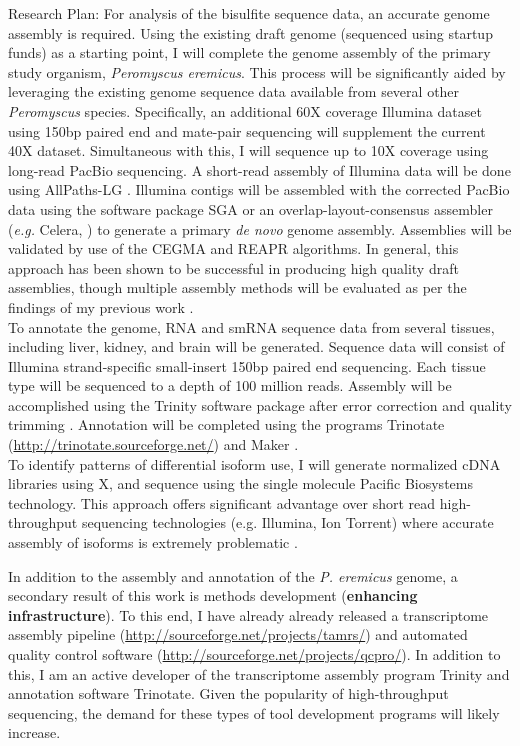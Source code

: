 \documentclass[11pt]{article}
\begin{document}
Research Plan: For analysis of the bisulfite sequence data, an accurate genome assembly is required. Using the existing draft genome (sequenced using startup funds) as a starting point, I will complete the genome assembly of the primary study organism, \textit{Peromyscus eremicus}. This process will be significantly aided by leveraging the existing genome sequence data available from several other \textit{Peromyscus} species. Specifically, an additional 60X coverage Illumina dataset using 150bp paired end and mate-pair sequencing will supplement the current 40X dataset. Simultaneous with this, I will sequence up to 10X coverage using long-read PacBio sequencing. A short-read assembly of Illumina data will be done using AllPaths-LG \citep{Maccallum:2009du}. Illumina contigs will be assembled with the corrected PacBio data using the software package SGA \citep{Simpson:2012ef} or an overlap-layout-consensus assembler (\textit{e.g.} Celera, \cite{Miller:2008jx}) to generate a primary \textit{de novo} genome assembly. Assemblies will be validated by use of the CEGMA \citep{Parra:2007df} and REAPR \citep{Hunt:2013hj} algorithms. In general, this approach has been shown to be successful in producing high quality draft assemblies, though multiple assembly methods will be evaluated as per the findings of my previous work \citep{Bradnam:2013gx}.\\

To annotate the genome, RNA and smRNA sequence data from several tissues, including liver, kidney, and brain will be generated. Sequence data will consist of Illumina strand-specific small-insert 150bp paired end sequencing. Each tissue type will be sequenced to a depth of 100 million reads. Assembly will be accomplished using the Trinity software package \citep{Haas:2013jq,Grabherr:2011jb} after error correction \citep{MacManes:2013ec} and quality trimming \citep{MacManes:2013ex}. Annotation will be completed using the programs Trinotate (\url{http://trinotate.sourceforge.net/}) and Maker \citep{Cantarel:2008jo}. \\

To identify patterns of differential isoform use, I will generate normalized cDNA libraries using X, and sequence using the single molecule Pacific Biosystems technology. This approach offers significant advantage over short read high-throughput sequencing technologies (e.g. Illumina, Ion Torrent) where accurate assembly of isoforms is extremely problematic \citep{Pyrkosz:2013tm}.


In addition to the assembly and annotation of the \textit{P. eremicus} genome, a secondary result of this work is methods development (\textbf{enhancing infrastructure}). To this end, I have already already released a transcriptome assembly pipeline (\url{http://sourceforge.net/projects/tamrs/}) and automated quality control software (\url{http://sourceforge.net/projects/qcpro/}). In addition to this, I am an active developer of the transcriptome assembly program Trinity and annotation software Trinotate. Given the popularity of high-throughput sequencing, the demand for these types of tool development programs will likely increase. \\
\end{document}
